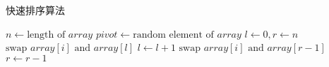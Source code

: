 \begin{algorithm}
  \caption{快速排序算法}
  \begin{algorithmic}[1]
    \State $n \gets \text{length of } array$
    \State $pivot \gets \text{random element of } array$
     \Return
    \EndIf
    \State $l \gets 0, r \gets n$
        \State $\text{swap } array[i] \text{ and } array[l]$
        \State $l \gets l + 1$
      \EndIf
    \EndFor
        \State $\text{swap } array[i] \text{ and } array[r - 1]$
        \State $r \gets r - 1$
      \EndIf
    \EndFor
    \State {}
    \State {}
  \EndProcedure
  \end{algorithmic}
\end{algorithm}